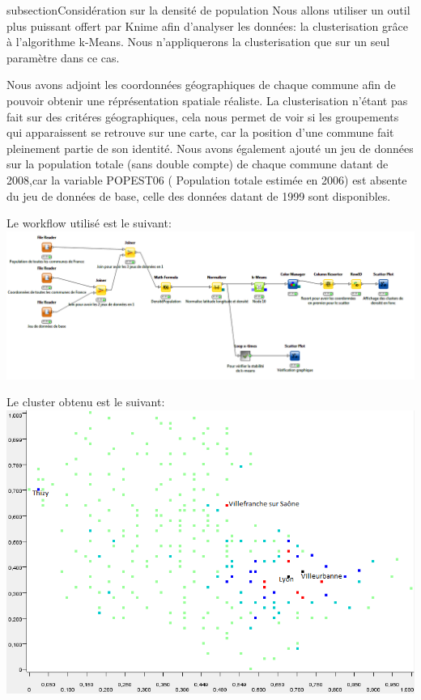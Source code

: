 {subsection{Considération sur la densité de population}
Nous allons utiliser un outil plus puissant offert par Knime afin d'analyser les données: la clusterisation grâce à  l'algorithme k-Means. Nous n'appliquerons la clusterisation que sur un seul paramètre dans ce cas.

Nous avons adjoint les coordonnées géographiques de chaque commune afin de pouvoir obtenir une réprésentation spatiale réaliste. La clusterisation n'étant pas fait sur des critéres géographiques, cela nous permet de voir si les groupements qui apparaissent se retrouve sur une carte, car la position d'une commune fait pleinement partie de son identité.
Nous avons également ajouté un jeu de données sur la population totale (sans double compte) de chaque commune datant de 2008,car la variable POPEST06 ( Population totale estimée en 2006) est absente du jeu de données de base, celle des données datant de 1999 sont disponibles. 

Le workflow utilisé est le suivant:
\includegraphics{png/Clusterisation en fonction de la densité de population.png}

Le cluster obtenu est le suivant:
\includegraphics{png/Clusters en fonction de la densité de population.png}

}
